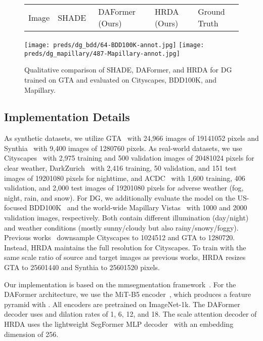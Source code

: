 \documentclass[journal,compsoc]{IEEEtran}
\begin{document}
\begin{figure*}[tb]
\centering
\begin{minipage}{0.8\linewidth}
{\footnotesize
\begin{tabularx}{\linewidth}{*{5}{Y}}
Image & SHADE~\cite{zhao2022style} & DAFormer (Ours) & HRDA (Ours) & Ground Truth \\
\end{tabularx}
} %
\texttt{[image: preds/dg\_bdd/64-BDD100K-annot.jpg]}
\texttt{[image: preds/dg\_mapillary/487-Mapillary-annot.jpg]}
\end{minipage}
\caption{Qualitative comparison of SHADE, DAFormer, and HRDA for DG trained on GTA and evaluated on Cityscapes, BDD100K, and Mapillary.}
\label{fig:visual_examples_dg}
\end{figure*}

\subsection{Implementation Details}

As synthetic datasets, we utilize GTA~\cite{richter2016playing} with 24,966 images of 19141052 pixels and Synthia~\cite{ros2016synthia} with 9,400 images of 1280760 pixels. As real-world datasets, we use Cityscapes~\cite{cordts2016cityscapes} with 2,975 training and 500 validation images of 20481024 pixels for clear weather, DarkZurich~\cite{sakaridis2020map} with 2,416 training, 50 validation, and 151 test images of 19201080 pixels for nighttime, and ACDC~\cite{sarkadis2021acdc} with 1,600 training, 406 validation, and 2,000 test images of 19201080 pixels for adverse weather (fog, night, rain, and snow). For DG, we additionally evaluate the model on the US-focused BDD100K~\cite{yu2020bdd100k} and the world-wide Mapillary Vistas~\cite{neuhold2017mapillary} with 1000 and 2000 validation images, respectively.
Both contain different illumination (day/night) and weather conditions (mostly sunny/cloudy but also rainy/snowy/foggy).
Previous works~\cite{tsai2018learning,tranheden2021dacs,araslanov2021self} downsample Cityscapes to 1024512 and GTA to 1280720. Instead, HRDA maintains the full resolution for Cityscapes. To train with the same scale ratio of source and target images as previous works, HRDA resizes GTA to 25601440 and Synthia to 25601520 pixels.

Our implementation is based on the mmsegmentation framework~\cite{mmseg2020}. For the DAFormer architecture, we use the MiT-B5 encoder~\cite{xie2021segformer}, which produces a feature pyramid with . All encoders are pretrained on ImageNet-1k. The DAFormer decoder uses  and dilation rates of 1, 6, 12, and 18.
The scale attention decoder of HRDA uses the lightweight SegFormer MLP decoder~\cite{xie2021segformer} with an embedding dimension of 256.
\end{document}

